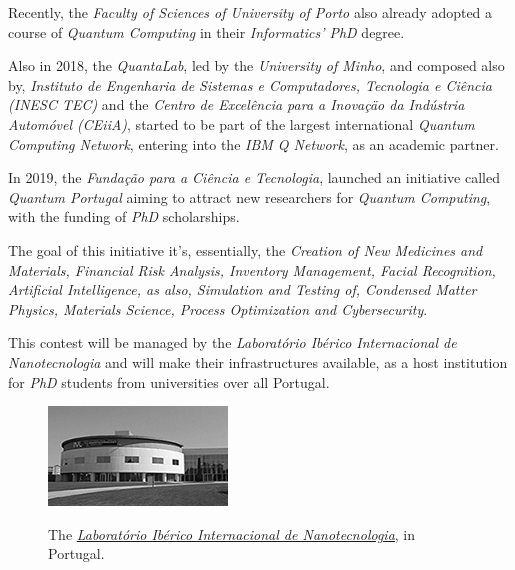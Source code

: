 \documentclass[conference]{IEEEtran}
\begin{document}
Recently, the \textit{Faculty of Sciences of University of Porto} also already adopted a course of \textit{Quantum Computing} in their \textit{Informatics' PhD} degree.

\vspace{4pt}

Also in 2018, the \textit{QuantaLab}, led by the \textit{University of Minho}, and composed also by, \textit{Instituto de Engenharia de Sistemas e Computadores, Tecnologia e Ci\^encia (INESC TEC)} and the \textit{Centro de Excel\^encia para a Inova\c{c}\"ao da Ind\'ustria Autom\'ovel (CEiiA)}, started to be part of the largest international \textit{Quantum Computing Network}, entering into the \textit{IBM Q Network}, as an academic partner.

\vspace{4pt}

In 2019, the \textit{Funda\c{c}\~{a}o para a Ci\^{e}ncia e Tecnologia}, launched an initiative called \textit{Quantum Portugal} aiming to attract new researchers for \textit{Quantum Computing}, with the funding of \textit{PhD} scholarships.

\vspace{4pt}

The goal of this initiative it's, essentially, the \textit{Creation of New Medicines and Materials, Financial Risk Analysis, Inventory Management, Facial Recognition, Artificial Intelligence, as also, Simulation and Testing of, Condensed Matter Physics, Materials Science, Process Optimization and Cybersecurity}.

\vspace{4pt}

This contest will be managed by the \textit{Laborat\'orio Ib\'erico Internacional de Nanotecnologia} and will make their infrastructures available, as a host institution for \textit{PhD} students from universities over all Portugal.

\begin{center}
  \begin{figure}[htbp]
    \centerline{\href{https://en.wikipedia.org/wiki/Schr\%C3\%B6dinger\%27s_cat}{\includegraphics{imgs/fig-8.png}}}
    \caption{The \href{https://en.wikipedia.org/wiki/Schr\%C3\%B6dinger\%27s_cat}{\textit{Laborat\'orio Ib\'erico Internacional de Nanotecnologia}}, in Portugal.}
    \label{fig}
  \end{figure}
\end{center}
\end{document}
